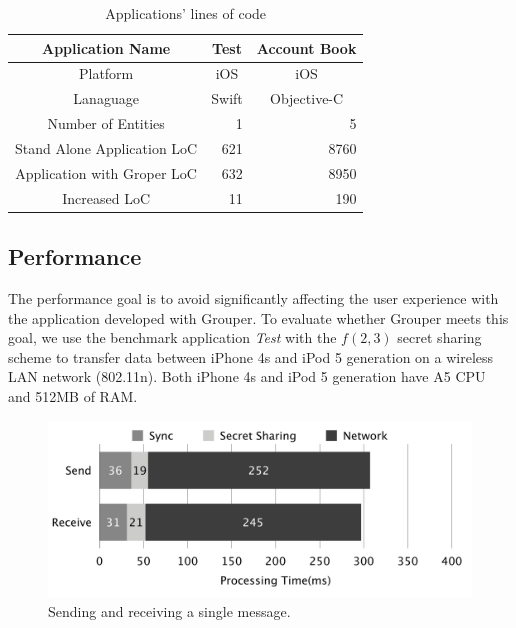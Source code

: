 \documentclass[twocolumn,10pt]{article}
\begin{document}
\begin{table}[!htb]
	\footnotesize
	\centering  
	\caption{Applications' lines of code}
	\begin{tabular}{c|c|c}
		\hline
		Application Name           & Test  & Account Book \\ \hline
		Platform            & iOS   & iOS          \\ \hline
		Lanaguage           & Swift & Objective-C  \\ \hline
		Number of Entities  & \multicolumn{1}{r|}{1}     & \multicolumn{1}{r}{5}            \\ \hline
		Stand Alone Application LoC     & \multicolumn{1}{r|}{621}   & \multicolumn{1}{r}{8760}         \\ \hline
		Application with Groper LoC     &  \multicolumn{1}{r|}{632}   & \multicolumn{1}{r}{8950}         \\ \hline
		Increased LoC & \multicolumn{1}{r|}{11}    & \multicolumn{1}{r}{190}           \\ \hline
	\end{tabular}
\end{table}

\subsection{Performance}

The performance goal is to avoid significantly affecting the user experience with the application developed with Grouper. 
To evaluate whether Grouper meets this goal, we use the benchmark application \emph{Test} with the $f(2, 3)$ secret sharing scheme to transfer data between iPhone 4s and iPod 5 generation on a wireless LAN network (802.11n). 
Both iPhone 4s and iPod 5 generation have A5 CPU and 512MB of RAM.

\begin{figure}[t]
	\centering
	\includegraphics[scale=0.12]{processing1}
	\caption{Sending and receiving a single message.}
\end{figure}
\end{document}
